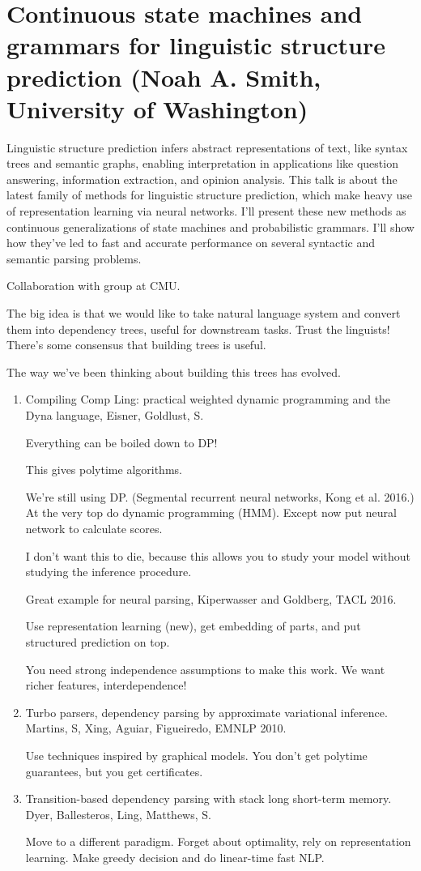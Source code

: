 \section{Continuous state machines and grammars for linguistic structure prediction (Noah A. Smith, University of Washington)}

Linguistic structure prediction infers abstract representations of text, like syntax trees and semantic graphs, enabling interpretation in applications like question answering, information extraction, and opinion analysis.  This talk is about the latest family of methods for linguistic structure prediction, which make heavy use of representation learning via neural networks.  I'll present these new methods as continuous generalizations of state machines and probabilistic grammars.  I'll show how they've led to fast and accurate performance on several syntactic and semantic parsing problems.

Collaboration with group at CMU.

The big idea is that we would like to take natural language system and convert them into dependency trees, useful for downstream tasks. Trust the linguists!
There's some consensus that building trees is useful.

The way we've been thinking about building this trees has evolved.
\begin{enumerate}
\item
Compiling Comp Ling: practical weighted dynamic programming and the Dyna language, Eisner, Goldlust, S.

Everything can be boiled down to DP!

This gives polytime algorithms.

We're still using DP. (Segmental recurrent neural networks, Kong et al. 2016.) At the very top do dynamic programming (HMM). Except now put neural network to calculate scores.

I don't want this to die, because this allows you to study your model without studying the inference procedure. 

Great example for neural parsing, Kiperwasser and Goldberg, TACL 2016. 

Use representation learning (new), get embedding of parts, and put structured prediction on top.

You need strong independence assumptions to make this work. We want richer features, interdependence!
\item
Turbo parsers, dependency parsing by approximate variational inference. Martins, S, Xing, Aguiar, Figueiredo, EMNLP 2010.

Use techniques inspired by graphical models. You don't get polytime guarantees, but you get certificates.
\item
Transition-based dependency parsing with stack long short-term memory. Dyer, Ballesteros, Ling, Matthews, S.

Move to a different paradigm. Forget about optimality, rely on representation learning. Make greedy decision and do linear-time fast NLP.
\end{enumerate}

